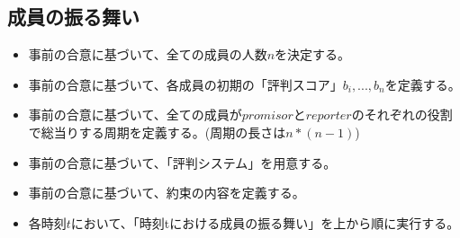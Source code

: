 \subsection{成員の振る舞い}
  \begin{itemize}
    \item 事前の合意に基づいて、全ての成員の人数$n$を決定する。
    \item 事前の合意に基づいて、各成員の初期の「評判スコア」$b_i, ..., b_n$を定義する。
    \item 事前の合意に基づいて、全ての成員が$promisor$と$reporter$のそれぞれの役割で総当りする周期を定義する。(周期の長さは$ n * (n-1)$)
    \item 事前の合意に基づいて、「評判システム」を用意する。
    \item 事前の合意に基づいて、約束の内容を定義する。
    \item 各時刻$t$において、「時刻tにおける成員の振る舞い」を上から順に実行する。
  \end{itemize}

